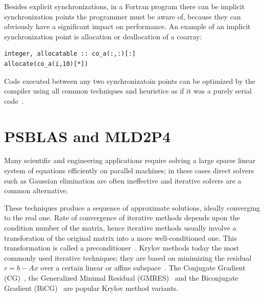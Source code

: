 \documentclass{IOS-Book-Article}
\begin{document}
Besides  explicit synchronizations, in a Fortran program there can be
implicit synchronization points the programmer must be aware of, 
because they can obviously have a significant impact on  performance. 
An example of an implicit synchronization point is allocation or
deallocation of a coarray: 
{\small
\begin{lstlisting}
integer, allocatable :: co_a(:,:)[:]
allocate(co_a(i,10)[*])
\end{lstlisting}}
Code executed between any two synchronizatoin points can be optimized
by the  compiler using all common techniques and heuristics  as if
it was a purely serial code~\cite{CAF}. 

\section{PSBLAS and MLD2P4}

Many  scientific and engineering applications require solving a
large sparse linear system of equations efficiently on parallel
machines;  in these cases direct solvers such as Gaussian elimination
are often ineffective and iterative solvers are a common alternative.

These techniques produce a sequence of approximate solutions, ideally
converging to the real one. Rate of convergence of iterative methods
depends upon the condition number of the matrix, hence iterative
methods usually involve a transforation of the original matrix into a
more well-conditioned one. This transformation is called a
preconditioner~\cite{barrett1994templates}. Krylov methods today the
most commonly used iterative techniques; they are based on minimizing
the residual $r=b-Ax$ over a certain linear or affine 
subspace~\cite{ipsen1998idea}. The Conjugate Gradient 
(CG)~\cite{shewchuk1994introduction}, the Generalized Minimal Residual  
(GMRES)~\cite{saad1986gmres} and the Biconjugate Gradient
(BiCG)~\cite{van1992bi} are popular Krylov method variants.
\end{document}
